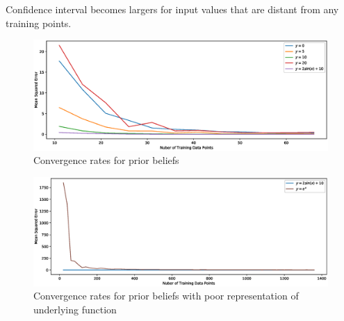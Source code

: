 Confidence interval becomes largers for input values that are distant from any training points. 







\begin{figure}[H]
    \centering
    \includegraphics[width = \textwidth]{images/Non_zero_mean_converge.eps}
    \caption{Convergence rates for prior beliefs}
    \label{fig:GPconvergence_rates}
\end{figure}

\begin{figure}[H]
    \centering
    \includegraphics[width=\textwidth]{images/Bad_Non_zero_mean_converge_change.eps}
    \caption{Convergence rates for prior beliefs with poor representation of underlying function}
    \label{fig:GPbad_prior}
\end{figure}









